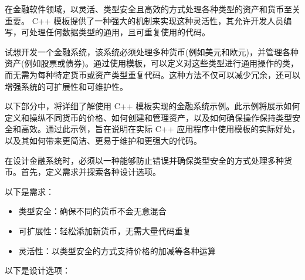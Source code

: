 
在金融软件领域，以灵活、类型安全且高效的方式处理各种类型的资产和货币至关重要。 C++ 模板提供了一种强大的机制来实现这种灵活性，其允许开发人员编写，可处理任何数据类型的通用，且可重复使用的代码。

试想开发一个金融系统，该系统必须处理多种货币(例如美元和欧元)，并管理各种资产(例如股票或债券)。通过使用模板，可以定义对这些类型进行通用操作的类，而无需为每种特定货币或资产类型重复代码。这种方法不仅可以减少冗余，还可以增强系统的可扩展性和可维护性。

以下部分中，将详细了解使用 C++ 模板实现的金融系统示例。此示例将展示如何定义和操纵不同货币的价格、如何创建和管理资产，以及如何确保操作保持类型安全和高效。通过此示例，旨在说明在实际 C++ 应用程序中使用模板的实际好处，以及其如何带来更简洁、更易于维护和更强大的代码。


在设计金融系统时，必须以一种能够防止错误并确保类型安全的方式处理多种货币。首先，定义需求并探索各种设计选项。

以下是需求：

\begin{itemize}
\item
类型安全：确保不同的货币不会无意混合

\item
可扩展性：轻松添加新货币，无需大量代码重复

\item
灵活性：以类型安全的方式支持价格的加减等各种运算
\end{itemize}

以下是设计选项：

